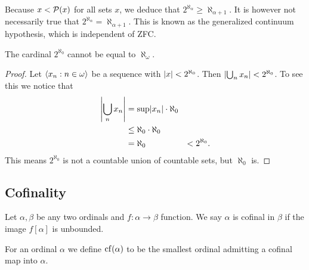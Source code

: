 Because \(x<\powset(x)\) for all sets \(x\), we deduce that
\(2^{\aleph_{\alpha}}\geq\aleph_{\alpha+1}\). It is however not necessarily true
that \(2^{\aleph_{\alpha}}=\aleph_{\alpha+1}\). This is known as the generalized
continuum hypothesis, which is independent of ZFC.

\begin{proposition}
    The cardinal \(2^{\aleph_{0}}\) cannot be equal to \(\aleph_{\omega}\).

    \begin{proof}
        Let \(\sequence{x_{n}}{n\in\omega}\) be a sequence with
        \(\abs{x}<2^{\aleph_{0}}\). Then
        \(\abs{\bigcup_{n}x_{n}}<2^{\aleph_{0}}\). To see this we notice that
        \begin{align*}
            \abs*{\bigcup_{n}x_{n}} & =\sup\abs{x_{n}}\cdot\aleph_{0} \\
                                    & \leq\aleph_{0}\cdot\aleph_{0}   \\
                                    & =\aleph_{0}
                                    & <2^{\aleph_{0}}.
        \end{align*}
        This means \(2^{\aleph_{0}}\) is not a countable union of countable
        sets, but \(\aleph_{0}\) is.
    \end{proof}
\end{proposition}

\subsection{Cofinality}
\begin{definition}
    Let \(\alpha,\beta\) be any two ordinals and \(f:\alpha\to\beta\) function.
    We say \(\alpha\) is cofinal in \(\beta\) if the image \(f[\alpha]\) is
    unbounded.

    For an ordinal \(\alpha\) we define \(\cf(\alpha)\) to be the smallest
    ordinal admitting a cofinal map into \(\alpha\).
\end{definition}

